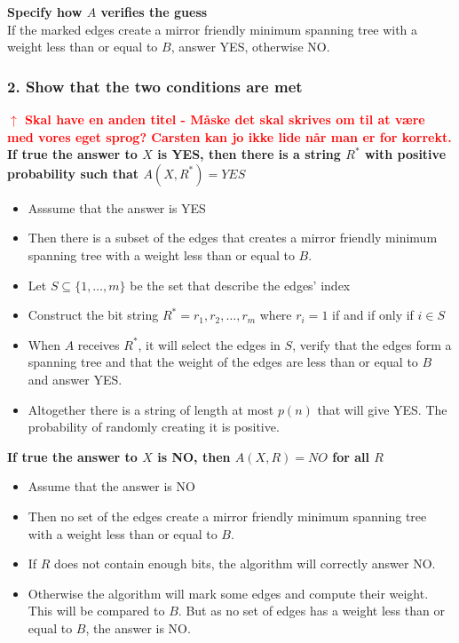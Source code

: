 \documentclass[12pt]{report}
\begin{document}
\textbf{Specify how $A$ verifies the guess}\\
If the marked edges create a mirror friendly minimum spanning tree with a weight less than or equal to $B$, answer YES, otherwise NO.

\subsubsection{2. Show that the two conditions are met}
\textbf{\textcolor{red}{$\uparrow$ Skal have en anden titel - M{\aa}ske det skal skrives om til at v{\ae}re med vores eget sprog? Carsten kan jo ikke lide n{\aa}r man er for korrekt.}}\\
\textbf{If true the answer to $X$ is YES, then there is a string $R^*$ with positive probability such that $A(X, R^*) = YES$}
\begin{itemize}
	\item[] Asssume that the answer is YES
	
	\item[] Then there is a subset of the edges that creates a mirror friendly minimum spanning tree with a weight less than or equal to $B$.
	
	\item[] Let $S \subseteq \{1,\dots,m\}$ be the set that describe the edges' index
	
	\item[] Construct the bit string $R^* = r_1,r_2,\dots,r_m$ where $r_i = 1$ if and if only if $i \in S$
	
	\item[] When $A$ receives $R^*$, it will select the edges in $S$, verify that the edges form a spanning tree and that the weight of the edges are less than or equal to $B$ and answer YES.
	
	\item[] Altogether there is a string of length at most $p(n)$ that will give YES. The probability of randomly creating it is positive.
\end{itemize}

\textbf{If true the answer to $X$ is NO, then $A(X, R) = NO$ for all $R$}
\begin{itemize}
	\item[] Assume that the answer is NO
	
	\item[] Then no set of the edges create a mirror friendly minimum spanning tree with a weight less than or equal to $B$.
	
	\item[] If $R$ does not contain enough bits, the algorithm will correctly answer NO.
	
	\item[] Otherwise the algorithm will mark some edges and compute their weight. This will be compared to $B$. But as no set of edges has a weight less than or equal to $B$, the answer is NO.
\end{itemize}
\end{document}
